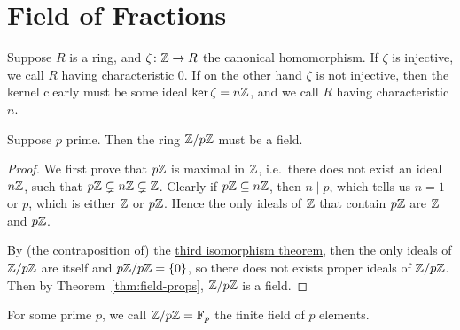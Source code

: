 \section{Field of Fractions}

\begin{definition}
    Suppose \(R\) is a ring,
    and \(\zeta\colon\mathbb{Z}\to R\) the canonical homomorphism.
    If \(\zeta\) is injective, %
    we call \(R\) having characteristic 0.
    If on the other hand \(\zeta\) is not injective,
    then the kernel clearly must be some ideal \(\ker\zeta = n\mathbb{Z}\),
    and we call \(R\) having characteristic \(n\).
\end{definition}
\begin{proposition}
    Suppose \(p\) prime.
    Then the ring \(\mathbb{Z}/p\mathbb{Z}\) must be a field.
\end{proposition}
\begin{proof}
    We first prove that \(p\mathbb{Z}\) is maximal in \(\mathbb{Z}\),
    i.e.\ there does not exist an ideal \(n\mathbb{Z}\),
    such that \(p\mathbb{Z} \subsetneq n\mathbb{Z} \subsetneq \mathbb{Z}\).
    Clearly if \(p\mathbb{Z} \subseteq n\mathbb{Z}\),
    then \(n \mid p\), which tells us \(n = 1\) or \(p\),
    which is either \(\mathbb{Z}\) or \(p\mathbb{Z}\).
    Hence the only ideals of \(\mathbb{Z}\) that contain \(p\mathbb{Z}\)
    are \(\mathbb{Z}\) and \(p\mathbb{Z}\).

    By (the contraposition of)
    the \hyperref[thm:iso-3-ring]{third isomorphism theorem},
    then the only ideals of \(\mathbb{Z}/p\mathbb{Z}\) are itself and \(p\mathbb{Z}/p\mathbb{Z} = \{0\}\),
    so there does not exists proper ideals of \(\mathbb{Z}/p\mathbb{Z}\).
    Then by Theorem~\ref{thm:field-props}, \(\mathbb{Z}/p\mathbb{Z}\) is a field.
\end{proof}
\begin{definition}
    For some prime \(p\),
    we call \(\mathbb{Z}/p\mathbb{Z} = \mathbb{F}_p\)
    the finite field of \(p\) elements.
\end{definition}

